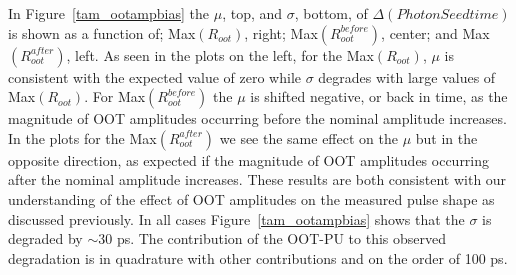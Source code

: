 In Figure~\ref{tam_ootampbias} the $\mu$, top, and $\sigma$, bottom, of $\Delta(Photon Seed time)$ is shown as a function of; Max$(R_{oot})$, right; Max$(R_{oot}^{before})$, center;  and Max$(R_{oot}^{after})$, left. As seen in the plots on the left, for the Max$(R_{oot})$, $\mu$ is consistent with the expected value of zero while $\sigma$ degrades with large values of Max$(R_{oot})$. For Max$(R_{oot}^{before})$ the $\mu$ is shifted negative, or back in time, as the magnitude of OOT amplitudes occurring before the nominal amplitude increases. In the plots for the Max$(R_{oot}^{after})$ we see the same effect on the $\mu$ but in the opposite direction, as expected if the magnitude of OOT amplitudes occurring after the nominal amplitude increases. These results are both consistent with our understanding of the effect of OOT amplitudes on the measured pulse shape as discussed previously. In all cases Figure~\ref{tam_ootampbias} shows that the $\sigma$ is degraded by $\sim$30 ps. The contribution of the OOT-PU to this observed degradation is in quadrature with other contributions and on the order of 100 ps.




